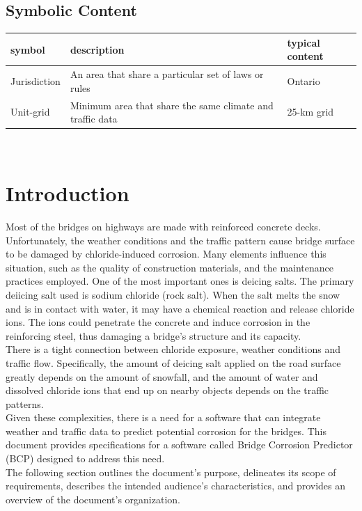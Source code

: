 \documentclass[12pt]{article}
\begin{document}
\subsection{Symbolic Content}
\renewcommand{\arraystretch}{1.2}
\begin{tabular}{l l l} 
  \toprule		
  \textbf{symbol} & \textbf{description} & \textbf{typical content} \\
  \midrule 
  Jurisdiction & An area that share a particular set of laws or rules & Ontario \\
  Unit-grid & Minimum area that share the same climate and traffic data & 25-km grid \\
  \bottomrule
\end{tabular}\\



\section{Introduction}
Most of the bridges on highways are made with reinforced concrete decks. Unfortunately, the weather conditions and the traffic pattern cause bridge surface to be damaged by chloride-induced corrosion. Many elements influence this situation, such as the quality of construction materials, and the maintenance practices employed. One of the most important ones is deicing salts. The primary deiicing salt used is sodium chloride (rock salt). When the salt melts the snow and is in contact with water, it may have a chemical reaction and release chloride ions. The ions could penetrate the concrete and induce corrosion in the reinforcing steel, thus damaging a bridge's structure and its capacity. \\
There is a tight connection between chloride exposure, weather conditions and traffic flow. Specifically, the amount of deicing salt applied on the road surface greatly depends on the amount of snowfall, and the amount of water and dissolved chloride ions that end up on nearby objects depends on the traffic patterns.\\
Given these complexities, there is a need for a software that can integrate weather and traffic data to predict potential corrosion for the bridges. This document provides specifications for a software called Bridge Corrosion Predictor (BCP) designed to address this need. \\
The following section outlines the document's purpose, delineates its scope of requirements, describes the intended audience's characteristics, and provides an overview of the document's organization.
\end{document}
